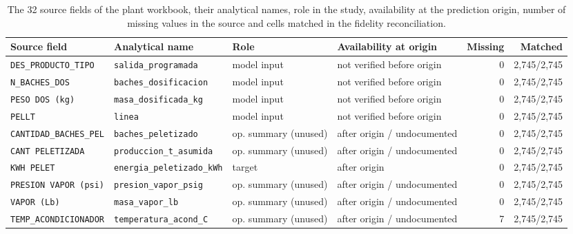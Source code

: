 \begin{table}[!htbp]\centering\scriptsize
\caption{The 32 source fields of the plant workbook, their analytical names, role in the study, availability at the prediction origin, number of missing values in the source and cells matched in the fidelity reconciliation.}\label{tab:s_variables}
\begin{tabularx}{\linewidth}{@{}>{\raggedright\arraybackslash}p{.16\linewidth}>{\raggedright\arraybackslash}p{.23\linewidth}>{\raggedright\arraybackslash}p{.15\linewidth}>{\raggedright\arraybackslash}Xrr@{}}\toprule
Source field & Analytical name & Role & Availability at origin & Missing & Matched \\\midrule
\texttt{DES\_\allowbreak{}PRODUCTO\_\allowbreak{}TIPO} & \texttt{salida\_\allowbreak{}programada} & model input & not verified before origin & 0 & 2,745/2,745 \\
\texttt{N\_\allowbreak{}BACHES\_\allowbreak{}DOS} & \texttt{baches\_\allowbreak{}dosificacion} & model input & not verified before origin & 0 & 2,745/2,745 \\
\texttt{PESO DOS (kg)} & \texttt{masa\_\allowbreak{}dosificada\_\allowbreak{}kg} & model input & not verified before origin & 0 & 2,745/2,745 \\
\texttt{PELLT} & \texttt{linea} & model input & not verified before origin & 0 & 2,745/2,745 \\
\texttt{CANTIDAD\_\allowbreak{}BACHES\_\allowbreak{}PEL} & \texttt{baches\_\allowbreak{}peletizado} & op. summary (unused) & after origin / undocumented & 0 & 2,745/2,745 \\
\texttt{CANT PELETIZADA} & \texttt{produccion\_\allowbreak{}t\_\allowbreak{}asumida} & op. summary (unused) & after origin / undocumented & 0 & 2,745/2,745 \\
\texttt{KWH PELET} & \texttt{energia\_\allowbreak{}peletizado\_\allowbreak{}kWh} & target & after origin & 0 & 2,745/2,745 \\
\texttt{PRESION VAPOR (psi)} & \texttt{presion\_\allowbreak{}vapor\_\allowbreak{}psig} & op. summary (unused) & after origin / undocumented & 0 & 2,745/2,745 \\
\texttt{VAPOR (Lb)} & \texttt{masa\_\allowbreak{}vapor\_\allowbreak{}lb} & op. summary (unused) & after origin / undocumented & 0 & 2,745/2,745 \\
\texttt{TEMP\_\allowbreak{}ACONDICIONADOR} & \texttt{temperatura\_\allowbreak{}acond\_\allowbreak{}C} & op. summary (unused) & after origin / undocumented & 7 & 2,745/2,745 \\

\end{tabularx}
\end{table}
